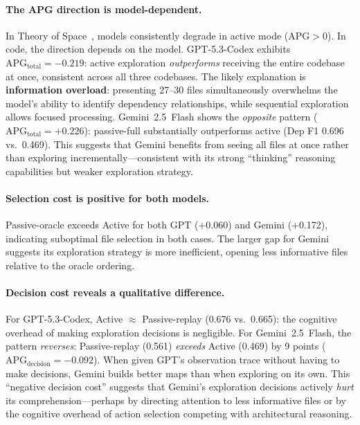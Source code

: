 \documentclass{article}
\begin{document}
\paragraph{The APG direction is model-dependent.}
In Theory of Space~\citep{zhang2026theoryofspace}, models consistently degrade in active mode ($\text{APG} > 0$). In code, the direction depends on the model. GPT-5.3-Codex exhibits $\text{APG}_\text{total} = -0.219$: active exploration \emph{outperforms} receiving the entire codebase at once, consistent across all three codebases. The likely explanation is \textbf{information overload}: presenting 27--30 files simultaneously overwhelms the model's ability to identify dependency relationships, while sequential exploration allows focused processing. Gemini~2.5~Flash shows the \emph{opposite} pattern ($\text{APG}_\text{total} = +0.226$): passive-full substantially outperforms active (Dep F1 0.696 vs.\ 0.469). This suggests that Gemini benefits from seeing all files at once rather than exploring incrementally---consistent with its strong ``thinking'' reasoning capabilities but weaker exploration strategy.

\paragraph{Selection cost is positive for both models.}
Passive-oracle exceeds Active for both GPT (+0.060) and Gemini (+0.172), indicating suboptimal file selection in both cases. The larger gap for Gemini suggests its exploration strategy is more inefficient, opening less informative files relative to the oracle ordering.

\paragraph{Decision cost reveals a qualitative difference.}
For GPT-5.3-Codex, Active $\approx$ Passive-replay (0.676 vs.\ 0.665): the cognitive overhead of making exploration decisions is negligible. For Gemini~2.5~Flash, the pattern \emph{reverses}: Passive-replay (0.561) \emph{exceeds} Active (0.469) by 9 points ($\text{APG}_\text{decision} = -0.092$). When given GPT's observation trace without having to make decisions, Gemini builds better maps than when exploring on its own. This ``negative decision cost'' suggests that Gemini's exploration decisions actively \emph{hurt} its comprehension---perhaps by directing attention to less informative files or by the cognitive overhead of action selection competing with architectural reasoning.
\end{document}
